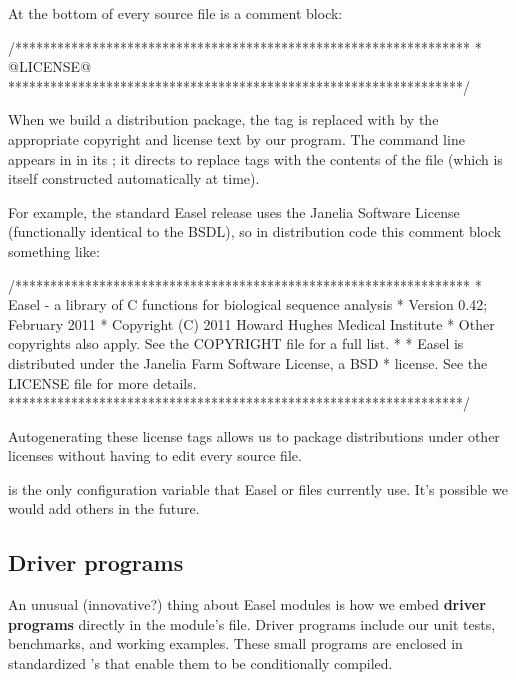 At the bottom of every source file is a comment block:

\begin{cchunk}
/*****************************************************************
 * @LICENSE@
 *****************************************************************/
\end{cchunk}

When we build a distribution package, the  tag is
replaced with by the appropriate copyright and license text by our
 program. The command line appears in
 in its ; it directs
 to replace  tags with the contents of
the  file (which is itself constructed
automatically at  time).

For example, the standard Easel release uses the Janelia Software
License (functionally identical to the BSDL), so in distribution code
this comment block something like:

\begin{cchunk}
/*****************************************************************
 * Easel - a library of C functions for biological sequence analysis
 * Version 0.42; February 2011
 * Copyright (C) 2011 Howard Hughes Medical Institute
 * Other copyrights also apply. See the COPYRIGHT file for a full list.
 *
 * Easel is distributed under the Janelia Farm Software License, a BSD
 * license. See the LICENSE file for more details.
 *****************************************************************/
\end{cchunk}

Autogenerating these license tags allows us to package distributions
under other licenses without having to edit every source file.

 is the only configuration variable that Easel
 or  files currently use. It's possible we would
add others in the future.


\subsection{Driver programs}

An unusual (innovative?) thing about Easel modules is how we embed
{\bfseries driver programs} directly in the module's 
file. Driver programs include our unit tests, benchmarks, and working
examples. These small programs are enclosed in standardized
's that enable them to be conditionally compiled.


